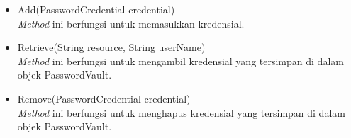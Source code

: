 \begin{itemize}
    \item{Add(PasswordCredential credential)\\\textit{Method} ini berfungsi untuk memasukkan kredensial.}
    \item{Retrieve(String resource, String userName)\\\textit{Method} ini berfungsi untuk mengambil kredensial yang tersimpan di dalam objek PasswordVault.}
    \item{Remove(PasswordCredential credential)\\\textit{Method} ini berfungsi untuk menghapus kredensial yang tersimpan di dalam objek PasswordVault.}
\end{itemize}

